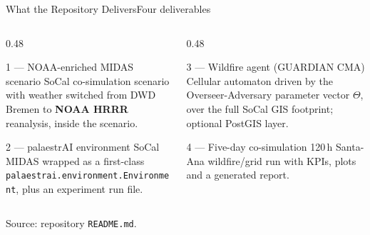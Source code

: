 \documentclass[aspectratio=169,9pt]{beamer}
\newcommand{\code}[1]{{\small\texttt{#1}}}
\newcommand{\gold}[1]{{\color{cslaeaglegold}\textbf{#1}}}
\newcommand{\srcnote}[1]{\vfill{\scriptsize\color{csladarkgray}#1}}
\begin{document}
\begin{frame}{What the Repository Delivers}{Four deliverables}
  \begin{columns}[T,onlytextwidth]
    \begin{column}{0.48\textwidth}
      \begin{block}{1 --- NOAA-enriched MIDAS scenario}
        \small SoCal co-simulation scenario with weather switched from
        DWD Bremen to \gold{NOAA HRRR} reanalysis, inside the scenario.
      \end{block}
      \begin{block}{2 --- palaestrAI environment}
        \small SoCal MIDAS wrapped as a first-class
        \code{palaestrai.environment.Environment}, plus an experiment run
        file.
      \end{block}
    \end{column}
    \begin{column}{0.48\textwidth}
      \begin{block}{3 --- Wildfire agent (GUARDIAN CMA)}
        \small Cellular automaton driven by the Overseer-Adversary
        parameter vector $\Theta$, over the full SoCal GIS footprint;
        optional PostGIS layer.
      \end{block}
      \begin{block}{4 --- Five-day co-simulation}
        \small 120\,h Santa-Ana wildfire/grid run with KPIs, plots and a
        generated report.
      \end{block}
    \end{column}
  \end{columns}
  \srcnote{Source: repository \texttt{README.md}.}
\end{frame}
\end{document}
